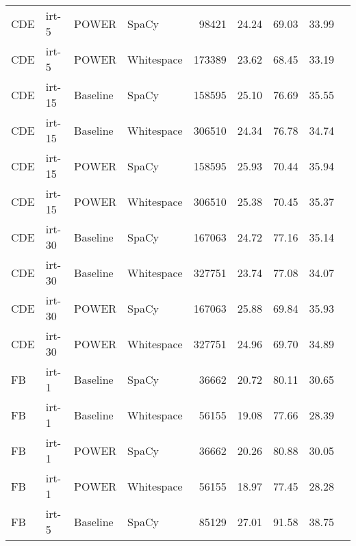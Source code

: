 \begin{tabular}{| l | l | l | l | r | r | r | r | r |}
    CDE & irt-5 & POWER & SpaCy & \num{98421} & 
    24.24 & 69.03 & 33.99 \\

    CDE & irt-5 & POWER & Whitespace & \num{173389} &
    23.62 & 68.45 & 33.19 \\

    \hline

    CDE & irt-15 & Baseline & SpaCy & \num{158595} &
    25.10 & 76.69 & 35.55 \\

    CDE & irt-15 & Baseline & Whitespace & \num{306510} &
    24.34 & 76.78 & 34.74 \\

    CDE & irt-15 & POWER & SpaCy & \num{158595} & 
    25.93 & 70.44 & 35.94 \\

    CDE & irt-15 & POWER & Whitespace & \num{306510} &
    25.38 & 70.45 & 35.37 \\

    \hline

    CDE & irt-30 & Baseline & SpaCy & \num{167063} &
    24.72 & 77.16 & 35.14 \\

    CDE & irt-30 & Baseline & Whitespace & \num{327751} &
    23.74 & 77.08 & 34.07 \\

    CDE & irt-30 & POWER & SpaCy & \num{167063} & 
    25.88 & 69.84 & 35.93 \\

    CDE & irt-30 & POWER & Whitespace & \num{327751} &
    24.96 & 69.70 & 34.89 \\

    \hline \hline

    FB & irt-1 & Baseline & SpaCy & \num{36662} &
    20.72 & 80.11 & 30.65 \\

    FB & irt-1 & Baseline & Whitespace & \num{56155} &
    19.08 & 77.66 & 28.39 \\

    FB & irt-1 & POWER & SpaCy & \num{36662} & 
    20.26 & 80.88 & 30.05 \\

    FB & irt-1 & POWER & Whitespace & \num{56155} &
    18.97 & 77.45 & 28.28 \\

    \hline

    FB & irt-5 & Baseline & SpaCy & \num{85129} &
    27.01 & 91.58 & 38.75 \\


\end{tabular}
